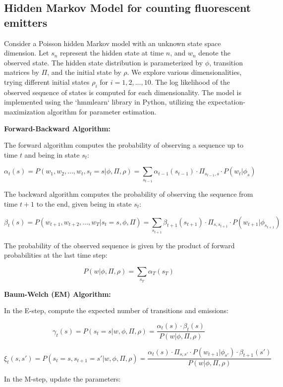 \documentclass{ucetd}
\begin{document}
\subsection{Hidden Markov Model for counting fluorescent emitters}

Consider a Poisson hidden Markov model with an unknown state space dimension. Let $s_{n}$ represent the hidden state at time $n$, and $w_{n}$ denote the observed state. The hidden state distribution is parameterized by $\phi$, transition matrices by $\Pi$, and the initial state by $\rho$. We explore various dimensionalities, trying different initial states $\rho_i$ for $i = 1, 2, ..., 10$. The log likelihood of the observed sequence of states is computed for each dimensionality. The model is implemented using the `hmmlearn` library in Python, utilizing the expectation-maximization algorithm for parameter estimation.

\textbf{Forward-Backward Algorithm:}

The forward algorithm computes the probability of observing a sequence up to time \(t\) and being in state \(s_t\):

\[
\alpha_t(s) = P(w_1, w_2, \ldots, w_t, s_t = s | \phi, \Pi, \rho) = \sum_{s_{t-1}} \alpha_{t-1}(s_{t-1}) \cdot \Pi_{s_{t-1}, s} \cdot P(w_t | \phi_s)
\]

The backward algorithm computes the probability of observing the sequence from time \(t+1\) to the end, given being in state \(s_t\):

\[
\beta_t(s) = P(w_{t+1}, w_{t+2}, \ldots, w_T | s_t = s, \phi, \Pi) = \sum_{s_{t+1}} \beta_{t+1}(s_{t+1}) \cdot \Pi_{s, s_{t+1}} \cdot P(w_{t+1} | \phi_{s_{t+1}})
\]

The probability of the observed sequence is given by the product of forward probabilities at the last time step:

\[
P(w | \phi, \Pi, \rho) = \sum_{s_T} \alpha_T(s_T)
\]

\textbf{Baum-Welch (EM) Algorithm:}

In the E-step, compute the expected number of transitions and emissions:

\[
\gamma_t(s) = P(s_t = s | w, \phi, \Pi, \rho) = \frac{\alpha_t(s) \cdot \beta_t(s)}{P(w | \phi, \Pi, \rho)}
\]

\[
\xi_t(s, s') = P(s_t = s, s_{t+1} = s' | w, \phi, \Pi, \rho) = \frac{\alpha_t(s) \cdot \Pi_{s, s'} \cdot P(w_{t+1} | \phi_{s'}) \cdot \beta_{t+1}(s')}{P(w | \phi, \Pi, \rho)}
\]

In the M-step, update the parameters:
\end{document}
